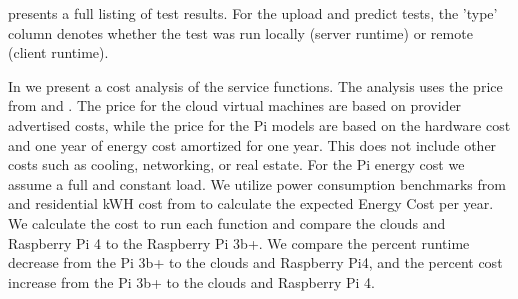  presents a full listing of test results. For the upload
    and predict tests, the 'type' column denotes whether the test was
    run locally (server runtime) or remote (client runtime). 

In  we present a cost analysis of the service
functions. The analysis uses the price from 
and . The price for the cloud virtual machines are based
on provider advertised costs, while the price for the Pi models are
based on the hardware cost and one year of energy cost amortized for
one year. This does not include other costs such as cooling,
networking, or real estate. For the Pi energy cost we assume a full
and constant load. We utilize power consumption benchmarks
from \cite{pi-power} and  residential kWH cost
from \cite{indiana-energy} to calculate the expected Energy Cost per
year. We calculate the cost to run each function and compare the
clouds and Raspberry Pi 4 to the Raspberry Pi 3b+. We compare the
percent runtime decrease from the Pi 3b+ to the clouds and Raspberry
Pi4, and the percent cost increase from the Pi 3b+ to the clouds and
Raspberry Pi 4.

